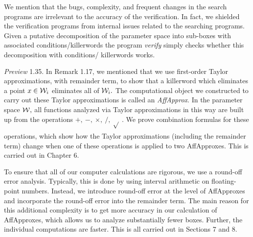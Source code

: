 We mention that the bugs, complexity, and 
frequent changes in the search programs are irrelevant to the 
accuracy of the verification.  In fact, we shielded the verification 
programs from internal issues related to the searching programs.  
Given a putative decomposition of the parameter space into 
sub-boxes with associated conditions/killerwords the program {\it verify} 
simply checks whether this decomposition with conditions/ 
killerwords works. 

 {\it Preview} {\rm 1.35}.  In Remark 1.17, we mentioned that we use first-order Taylor approximations, with remainder term, to show that
a killerword which eliminates a point $x\in {\cal W}_i$ eliminates all of ${\cal W}_i.$  
The computational object we constructed to carry out these Taylor approximations is called an {\it AffApprox}.
In the parameter space ${\cal W},$ all functions analyzed via Taylor
approximations in this way are built up from the
operations $ +,\ -,\ \times, \  /,\ \sqrt{}_{\phantom{|}} .$  We prove combination
formulas for these operations, which show how the Taylor approximations
(including the remainder term) change when one of these operations is
applied to two AffApproxes.   This is carried out in Chapter 6. 

To ensure that all of our computer calculations are rigorous, we use a round-off error analysis.  Typically, this is done by using interval
arithmetic on floating-point numbers. 
Instead, we introduce
round-off error at the level of AffApproxes and
incorporate the round-off error into the remainder term.  
The main reason for this additional complexity is to get
more accuracy in our calculation of AffApproxes, 
which allows us to analyze substantially fewer boxes.
Further, the individual computations are faster.
This is all
carried out in Sections 7 and 8.
 

 




